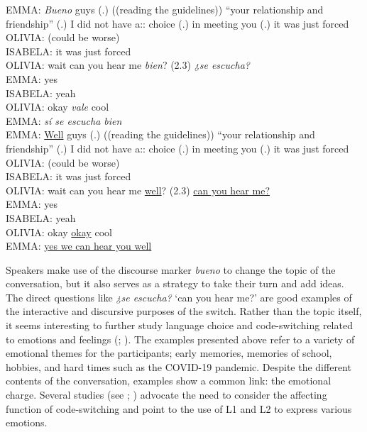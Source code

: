 \documentclass[output=paper]{langscibook}
\begin{document}
\begin{exe}\ex\label{RG:ex15}
EMMA: \textit{Bueno} guys (.) ((reading the guidelines)) “your relationship and friendship” (.) I did not have a:: choice (.) in meeting you (.) it was just forced\\
OLIVIA: (could be worse)\\
ISABELA: it was just forced\\
OLIVIA: wait can you hear me \textit{bien}? (2.3) \textit{¿se escucha?}\\
EMMA: yes\\
ISABELA: yeah\\
OLIVIA: okay \textit{vale} cool\\
EMMA:\textit{ sí se escucha bien}\\

EMMA: \ul{Well} guys (.) ((reading the guidelines)) “your relationship and friendship” (.) I did not have a:: choice (.) in meeting you (.) it was just forced\\
OLIVIA: (could be worse)\\
ISABELA: it was just forced\\
OLIVIA: wait can you hear me \ul{well}? (2.3) \ul{can you hear me?}\\
EMMA: yes\\
ISABELA: yeah\\
OLIVIA: okay \ul{okay} cool\\
EMMA: \ul{yes we can hear you well}
\end{exe}

Speakers make use of the discourse marker \textit{bueno} to change the topic of the conversation, but it also serves as a strategy to take their turn and add ideas. The direct questions like \textit{¿se escucha?} ‘can you hear me?’ are good examples of the interactive and discursive purposes of the switch. Rather than the topic itself, it seems interesting to further study language choice and code-switching related to emotions and feelings (\citealt{pavlenko_emotions_2007};  \citealt{dewaele_emotions_2010}). The examples presented above refer to a variety of emotional themes for the participants; early memories, memories of school, hobbies, and hard times such as the COVID-19 pandemic. Despite the different contents of the conversation, examples show a common link: the emotional charge. Several studies (see \citealt{lantto_code-switching_2014}; \citealt{acuna_ferreira_code-switching_2017}) advocate the need to consider the affecting function of code-switching and point to the use of L1 and L2 to express various emotions.
\end{document}
